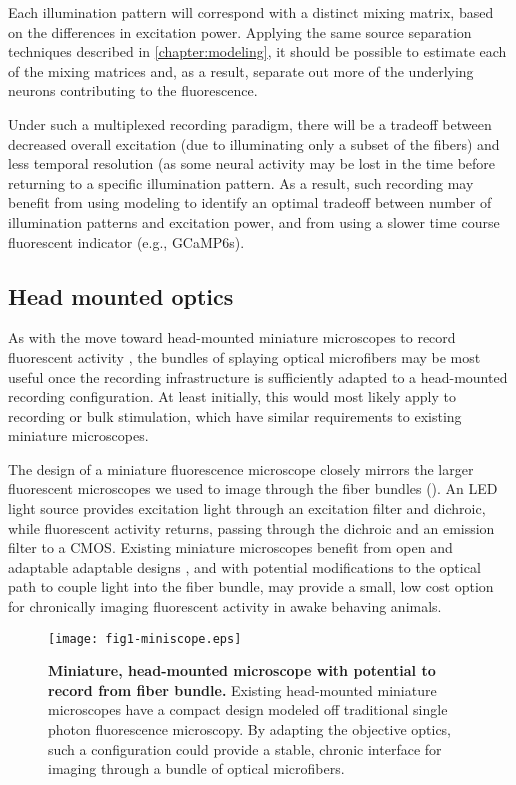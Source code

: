 Each illumination pattern will correspond with a 
distinct mixing matrix, based on the differences 
in excitation power. Applying the same source 
separation techniques described in 
\cref{chapter:modeling}, it should be possible 
to estimate each of the mixing matrices and, as 
a result, separate out more of the underlying 
neurons contributing to the fluorescence.

Under such a multiplexed recording paradigm, there 
will be a tradeoff between decreased overall 
excitation (due to illuminating only a subset of the 
fibers) and less temporal resolution (as some 
neural activity may be lost in the time before 
returning to a specific illumination pattern. 
As a result, such recording may benefit from using 
modeling to identify an optimal tradeoff between 
number of illumination patterns and excitation 
power, and from using a slower time course 
fluorescent indicator (e.g., GCaMP6s).

\subsection{Head mounted optics}

As with the move toward head-mounted miniature 
microscopes to record fluorescent activity 
\cite{Ghosh:2011ee,Cai:2016hm,LibertiIII:2017df}, 
the bundles of splaying optical microfibers may 
be most useful once the recording infrastructure 
is sufficiently adapted to a head-mounted 
recording configuration. At least initially, this 
would most likely apply to recording or bulk 
stimulation, which have similar requirements to 
existing miniature microscopes. 

The design of a miniature fluorescence microscope 
closely mirrors the larger fluorescent microscopes 
we used to image through the fiber bundles 
(). An LED light source 
provides excitation light through an excitation 
filter and dichroic, while fluorescent activity 
returns, passing through the dichroic and an 
emission filter to a CMOS. Existing miniature 
microscopes benefit from open and adaptable 
adaptable designs \cite{Cai:2016hm,LibertiIII:2017df},
and with potential modifications to the optical 
path to couple light into the fiber bundle, 
may provide a small, low cost option for 
chronically imaging fluorescent activity in awake
behaving animals.

\begin{figure}
\texttt{[image: fig1-miniscope.eps]}
\caption[Miniature microscope]{\textbf{Miniature, head-mounted 
microscope with potential to record from fiber bundle.} Existing 
head-mounted miniature microscopes have a compact design modeled 
off traditional single photon fluorescence microscopy. By 
adapting the objective optics, such a configuration could 
provide a stable, chronic interface for imaging through a bundle 
of optical microfibers. \cite{LibertiIII:2017df}}
\label{fig:miniscope}
\end{figure}

